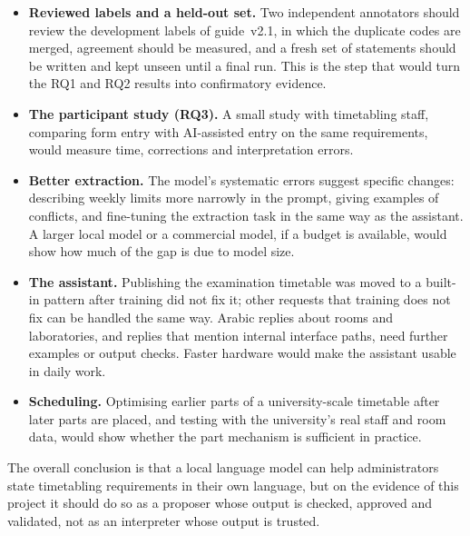 \begin{itemize}
\item \textbf{Reviewed labels and a held-out set.} Two independent annotators should review the development labels of guide~v2.1, in which the duplicate codes are merged, agreement should be measured, and a fresh set of statements should be written and kept unseen until a final run. This is the step that would turn the RQ1 and RQ2 results into confirmatory evidence.
\item \textbf{The participant study (RQ3).} A small study with timetabling staff, comparing form entry with AI-assisted entry on the same requirements, would measure time, corrections and interpretation errors.
\item \textbf{Better extraction.} The model's systematic errors suggest specific changes: describing weekly limits more narrowly in the prompt, giving examples of conflicts, and fine-tuning the extraction task in the same way as the assistant. A larger local model or a commercial model, if a budget is available, would show how much of the gap is due to model size.
\item \textbf{The assistant.} Publishing the examination timetable was moved to a built-in pattern after training did not fix it; other requests that training does not fix can be handled the same way. Arabic replies about rooms and laboratories, and replies that mention internal interface paths, need further examples or output checks. Faster hardware would make the assistant usable in daily work.
\item \textbf{Scheduling.} Optimising earlier parts of a university-scale timetable after later parts are placed, and testing with the university's real staff and room data, would show whether the part mechanism is sufficient in practice.
\end{itemize}

The overall conclusion is that a local language model can help administrators state timetabling requirements in their own language, but on the evidence of this project it should do so as a proposer whose output is checked, approved and validated, not as an interpreter whose output is trusted.
